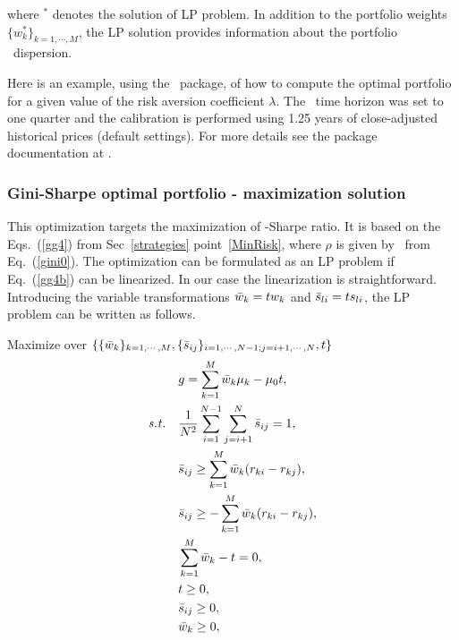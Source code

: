 \noindent where $^*$ denotes the solution of LP problem.
In addition to the portfolio weights $\{w_k^*\}_{k=1,\cdots,M}$, the
LP solution provides information about the portfolio \GINI\ dispersion.

\bigskip
\noindent Here is an example, using the \azapy\ package, of how to compute the optimal portfolio
for a given value of the risk aversion coefficient $\lambda$.
The \GINI\ time horizon was set to one quarter and the calibration is performed using 1.25 years of
close-adjusted historical prices (default settings).
For more details see the package documentation at \azapydoc.



\BackToContents


\subsubsection{Gini-Sharpe optimal portfolio - maximization solution}
This optimization targets the maximization of \GINI-Sharpe ratio. It is based on the
Eqs.~(\ref{gg4}) from Sec~\ref{strategies} point~\ref{MinRisk},
where $\rho$ is given by \GINI\ from Eq.~(\ref{gini0}).
The optimization can be formulated as an LP problem
if Eq.~(\ref{gg4b}) can be linearized. In our case the linearization is straightforward. Introducing the
variable transformations ${\bar w}_k = t w_k$ and ${\bar s}_{li} = t s_{li}$, the LP
problem can be written as follows.

\bigskip
\noindent Maximize over $\{ \{{\bar w}_k\}_{k=1,\cdots,M}, \{{\bar s}_{ij}\}_{i=1,\cdots,N-1; j = i+1,\cdots,N}, t \}$
\begin{subequations}\label{gini7}
\begin{align}
    &g = \sum_{k=1}^M \bw_k \mu_k - \mu_0 t, \label{gini7a} \\
    \st &\frac{1}{N^2} \sum_{i=1}^{N-1} \sum_{j=i+1}^N \bs_{ij} = 1, \label{gini7d} \\
        &\bs_{ij} \geq \sum_{k=1}^M \bw_k (r_{ki} - r_{kj}), \label{gini7b} \\
        &\bs_{ij} \geq -\sum_{k=1}^M \bw_k (r_{ki} - r_{kj}), \label{gini7c} \\
        & \sum_{k=1}^M \bw_k - t = 0, \label{gini7e} \\
        & t \geq 0, \label{gini7h} \\
        & \bs_{ij} \geq 0, \label{gini7g} \\
        & \bw_k \geq 0, \label{gini7f}
\end{align}
\end{subequations}


